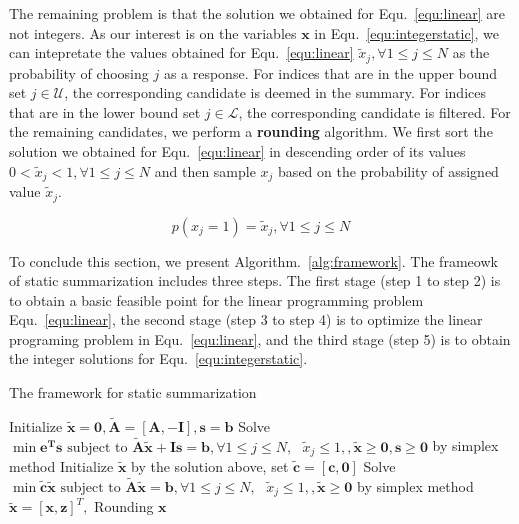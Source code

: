 \documentclass{llncs}
\begin{document}
The remaining problem is that the solution we obtained for Equ.~\ref{equ:linear} are not integers. As our interest is on the variables $\mathbf{x}$ in Equ.~\ref{equ:integerstatic}, we can intepretate the values obtained for Equ.~\ref{equ:linear} $\tilde{x}_j, \forall 1\leq j\leq N $ as the probability of choosing $j$ as a response. For indices that are in the upper bound set $j \in \mathcal{U}$, the corresponding candidate is deemed in the summary. For indices that are in the lower bound set $j \in \mathcal{L}$, the corresponding candidate is filtered. For the remaining candidates, we perform a \textbf{rounding} algorithm. We first sort the solution we obtained for Equ.~\ref{equ:linear} in descending order of its values $0< \tilde{x}_j< 1,\forall 1\leq j\leq N$ and then sample $x_j$ based on the probability of assigned value $\tilde{x}_j$. 

\begin{equation}
p(x_j=1)= \tilde{x}_j, \forall 1\leq j \leq N
\end{equation}



To conclude this section, we present Algorithm.~\ref{alg:framework}. The frameowk of static summarization includes three steps. The first stage (step 1 to step 2) is to obtain a basic feasible point for the linear programming problem Equ.~\ref{equ:linear}, the second stage (step 3 to step 4) is to optimize the linear programing problem in Equ.~\ref{equ:linear}, and the third stage (step 5) is to obtain the integer solutions for Equ.~\ref{equ:integerstatic}.   

\begin{algorithm}\label{alg:framework}
\caption{The framework for static summarization}

Initialize $\tilde{\mathbf{x}}=\mathbf{0},\tilde{\mathbf{A}}=[\mathbf{A},-\mathbf{I}],\mathbf{s}=\mathbf{b}$\;
Solve $\min \mathbf{e^{T}s} \textrm{ subject to } \tilde{\mathbf{A}}\tilde{\mathbf{x}} + \mathbf{Is} = \mathbf{b},  \forall 1\leq j\leq N,\textrm{ } \tilde{x}_j \leq 1, ,\tilde{\mathbf{x}}\geq \mathbf{0}, \mathbf{s}\geq \mathbf{0}$ by simplex method\;
Initialize $\tilde{\mathbf{x}}$ by the solution above, set $\tilde{\mathbf{c}}=[\mathbf{c},\mathbf{0}]$  \;
Solve $\min \tilde{\mathbf{c}}\tilde{\mathbf{x}}\textrm{ subject to } \tilde{\mathbf{A}}\tilde{\mathbf{x}} = \mathbf{b}, \forall 1\leq j\leq N,\textrm{ } \tilde{x}_j \leq 1, ,\tilde{\mathbf{x}}\geq \mathbf{0}$ by simplex method\;
$\tilde{\mathbf{x}}=[\mathbf{x},\mathbf{z}]^T,$ Rounding $\mathbf{x}$\;
\end{algorithm}
\end{document}
